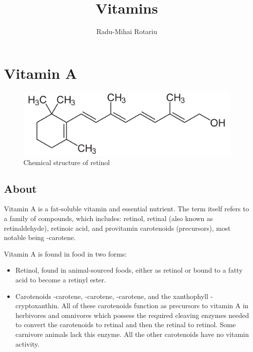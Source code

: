 \documentclass{book}
\title{Vitamins}
\author{Radu-Mihai Rotariu}
\date{}
\begin{document}
\begin{titlepage}
\maketitle
\end{titlepage}
\tableofcontents
\newpage
\begin{sloppypar}

\chapter{Vitamin A}
\begin{figure}[h]
	\caption{Chemical structure of retinol}
	\centering \includegraphics[width=\textwidth]{images/Vitamin_A_chemical_structure}
\end{figure}
\newpage

\section{About}
Vitamin A is a fat-soluble vitamin and essential nutrient. The term itself refers to a family of compounds, which includes: retinol, retinal (also known as retinaldehyde), retinoic acid, and provitamin carotenoids (precursors), most notable being \textbeta-carotene.

Vitamin A is found in food in two forms:
\begin{itemize}
	\item Retinol, found in animal-sourced foods, either as retinol or bound to a fatty acid to become a retinyl ester.
	\item Carotenoids \textalpha-carotene, \textbeta-carotene, \textgamma-carotene, and the xanthophyll \textbeta-cryptoxanthin. All of these carotenoids function as precursors to vitamin A in herbivores and omnivores which possess the required cleaving enzymes needed to convert the carotenoids to retinal and then the retinal to retinol. Some carnivore animals lack this enzyme. All the other carotenoids have no vitamin activity.
\end{itemize}


\end{sloppypar}
\end{document}
